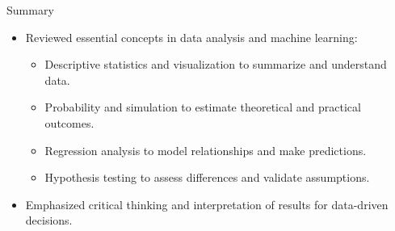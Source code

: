 \documentclass{beamer}
\begin{document}
\begin{frame}{Summary}
\begin{itemize}
    \item Reviewed essential concepts in data analysis and machine learning:
    \begin{itemize}
        \item Descriptive statistics and visualization to summarize and understand data.
        \item Probability and simulation to estimate theoretical and practical outcomes.
        \item Regression analysis to model relationships and make predictions.
        \item Hypothesis testing to assess differences and validate assumptions.
    \end{itemize}
    \item Emphasized critical thinking and interpretation of results for data-driven decisions.
\end{itemize}
\end{frame}



\frame{\titlepage}
\end{document}
